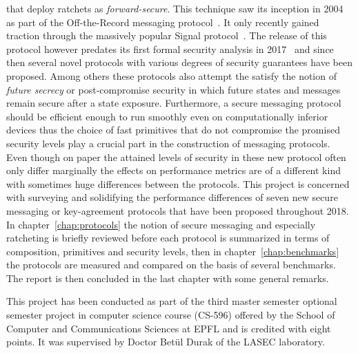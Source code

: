 \documentclass[11pt,a4paper,twoside,openright,bibliography=totoc]{scrbook}
\begin{document}
that deploy ratchets as \textit{forward-secure}. This technique saw
its inception in 2004 as part of the Off-the-Record messaging
protocol~\cite{borisov2004off}. It only recently gained traction
through the massively popular Signal protocol~\cite{perrin2016double}.
The release of this protocol however predates its first formal
security analysis in 2017~\cite{cohn2017formal}
and since then several novel protocols with various degrees of
security guarantees have been proposed. Among others
these protocols also attempt the satisfy the notion of
\textit{future secrecy} or post-compromise security in which future states and
messages remain secure after a state exposure. Furthermore, a secure messaging
protocol should be efficient enough to run smoothly even on
computationally inferior devices thus the choice of fast primitives
that do not compromise the promised security levels play a crucial
part in the construction of messaging protocols. Even though on paper
the attained levels of security in these new protocol often only
differ marginally the effects on performance metrics are of a
different kind with sometimes huge differences between the protocols.
%
%
This project is concerned with surveying and solidifying the
performance differences of seven new secure messaging or key-agreement
protocols that have been proposed throughout 2018. In
chapter~\ref{chap:protocols} the notion of secure messaging and
especially ratcheting is briefly reviewed before each protocol is
summarized in terms of composition, primitives and security levels, then in
chapter~\ref{chap:benchmarks} the protocols are measured and compared
on the basis of several benchmarks. The report is then concluded
in the last chapter with some general remarks.
%
%

\bigskip

This project has been conducted as part of the third master semester optional
semester project in computer science course (CS-596) offered by the
School of Computer and Communications Sciences at EPFL and is credited
with eight points. It was supervised by Doctor Betül Durak of
the LASEC laboratory.
\end{document}
